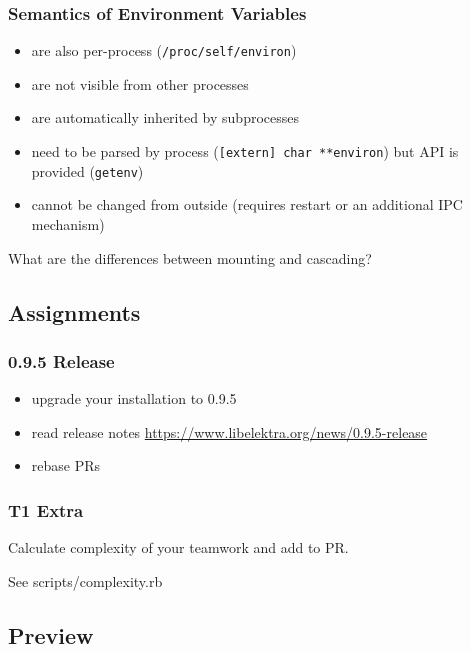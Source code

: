 \begin{frame}
	\frametitle{Semantics of Environment Variables}

	\pause
	\begin{itemize}
	\item are also per-process (\texttt{/proc/self/environ})
	\item are not visible from other processes
	\item are automatically inherited by subprocesses
	\item need to be parsed by process (\texttt{[extern] char **environ}) but API is provided (\texttt{getenv})
	\item cannot be changed from outside (requires restart or an additional IPC mechanism)
	\end{itemize}
\end{frame}

\begin{assignment}
	\begin{task}
	What are the differences between mounting and cascading?
	\end{task}
\end{assignment}

\subsection{Assignments}

\begin{frame}
	\frametitle{0.9.5 Release}

	\begin{itemize}[<+-| alert@+>]
	\item upgrade your installation to 0.9.5
	\item read release notes \url{https://www.libelektra.org/news/0.9.5-release}
	\item rebase PRs
	\end{itemize}
\end{frame}

\begin{assignment}
	\frametitle{T1 Extra}

	\begin{task}
	Calculate complexity of your teamwork and add to PR.
	\end{task}

	See scripts/complexity.rb
\end{assignment}


\subsection{Preview}

